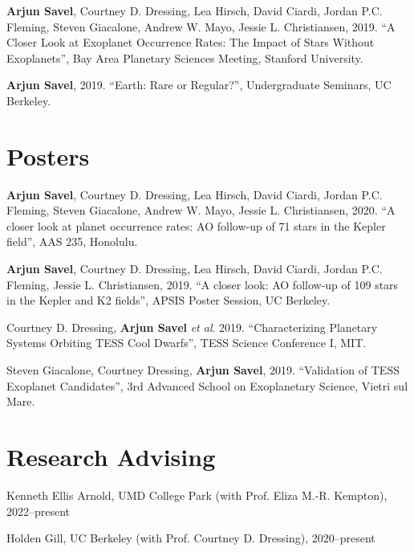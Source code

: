 \documentclass[letterpaper,10.5pt]{article}
\newcommand{\resumeSubHeadingListStart}{\begin{itemize}[leftmargin=*]}
\newcommand{\shorterSection}[1]{\vspace{-10pt}\section{#1}}
\begin{document}
\begin{list}{}{\cvlist}
\item[{\color{numcolor}\scriptsize2}] \textbf{Arjun Savel}, Courtney D. Dressing, Lea Hirsch, David Ciardi, Jordan P.C. Fleming, Steven Giacalone, Andrew W. Mayo, Jessie L. Christiansen, 2019. “A Closer Look at Exoplanet Occurrence Rates: The Impact of Stars Without Exoplanets”, Bay Area Planetary Sciences Meeting, Stanford University.

\item[{\color{numcolor}\scriptsize1}] \textbf{Arjun Savel}, 2019. “Earth: Rare or Regular?”, Undergraduate Seminars, UC Berkeley.

\end{list}
  

  

\shorterSection{Posters}
\small
  \begin{list}{}{\cvlist}
  \item[{\color{numcolor}\scriptsize4}]\textbf{Arjun Savel}, Courtney D. Dressing, Lea Hirsch, David Ciardi, Jordan P.C. Fleming, Steven Giacalone, Andrew W. Mayo, Jessie L. Christiansen, 2020. “A closer look at planet occurrence rates: AO follow-up of 71 stars in the Kepler field”, AAS 235, Honolulu.

  \item[{\color{numcolor}\scriptsize3}] \textbf{Arjun Savel}, Courtney D. Dressing, Lea Hirsch, David Ciardi, Jordan P.C. Fleming, Jessie L. Christiansen, 2019. “A closer look: AO follow-up of 109 stars in the Kepler and K2 fields”, APSIS Poster Session, UC Berkeley.

\item[{\color{numcolor}\scriptsize2}] Courtney D. Dressing, \textbf{Arjun Savel} \textit{et al}. 2019. “Characterizing Planetary Systems Orbiting TESS Cool Dwarfs”, TESS Science Conference I, MIT.

\item[{\color{numcolor}\scriptsize1}] Steven Giacalone, Courtney Dressing, \textbf{Arjun Savel}, 2019. “Validation of TESS Exoplanet Candidates”, 3rd Advanced School on Exoplanetary Science, Vietri sul Mare.

  \end{list}

\shorterSection{Research Advising}
\small
  \begin{list}{}{\cvlist}
  \item[{\color{numcolor}}]Kenneth Ellis Arnold, UMD College Park (with Prof. Eliza M.-R. Kempton), 2022--present
  \item[{\color{numcolor}}]Holden Gill, UC Berkeley (with Prof. Courtney D. Dressing), 2020--present


  \end{list}
\end{document}
